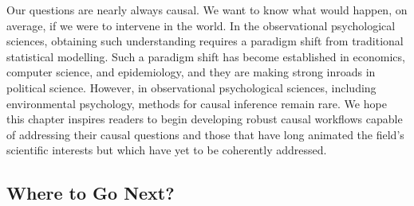 \documentclass[
  singlecolumn]{article}
\begin{document}
Our questions are nearly always causal. We want to know what would
happen, on average, if we were to intervene in the world. In the
observational psychological sciences, obtaining such understanding
requires a paradigm shift from traditional statistical modelling. Such a
paradigm shift has become established in economics, computer science,
and epidemiology, and they are making strong inroads in political
science. However, in observational psychological sciences, including
environmental psychology, methods for causal inference remain rare. We
hope this chapter inspires readers to begin developing robust causal
workflows capable of addressing their causal questions and those that
have long animated the field's scientific interests but which have yet
to be coherently addressed.

\subsection{Where to Go Next?}\label{where-to-go-next}
\end{document}
